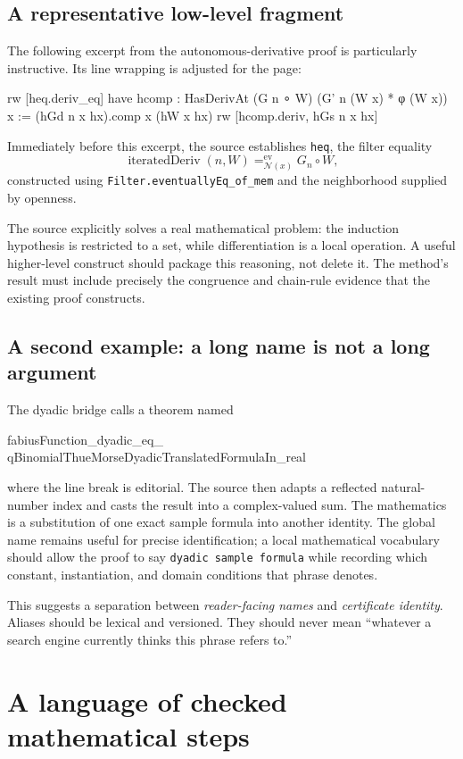 \documentclass[11pt,a4paper]{article}
\theoremstyle{remark}
\newcommand{\ty}[1]{\texttt{#1}}
\begin{document}
\subsection{A representative low-level fragment}
The following excerpt from the autonomous-derivative proof is particularly instructive. Its line wrapping is adjusted for the page:
\Needspace{82pt}
\begin{code}
rw [heq.deriv_eq]
have hcomp : HasDerivAt (G n ∘ W)
    (G' n (W x) * φ (W x)) x :=
  (hGd n x hx).comp x (hW x hx)
rw [hcomp.deriv, hGs n x hx]
\end{code}
Immediately before this excerpt, the source establishes \ty{heq}, the filter equality
\[
\operatorname{iteratedDeriv}(n,W)=^{\!\mathrm{ev}}_{\mathcal{N}(x)}G_n\circ W,
\]
constructed using \ty{Filter.eventuallyEq\_of\_mem} and the neighborhood supplied by openness.\cite{proveit-ode}

The source explicitly solves a real mathematical problem: the induction hypothesis is restricted to a set, while differentiation is a local operation. A useful higher-level construct should package this reasoning, not delete it. The method's result must include precisely the congruence and chain-rule evidence that the existing proof constructs.

\subsection{A second example: a long name is not a long argument}
The dyadic bridge calls a theorem named
\Needspace{46pt}
\begin{code}
fabiusFunction_dyadic_eq_
  qBinomialThueMorseDyadicTranslatedFormulaIn_real
\end{code}
where the line break is editorial. The source then adapts a reflected natural-number index and casts the result into a complex-valued sum.\cite{proveit-alias} The mathematics is a substitution of one exact sample formula into another identity. The global name remains useful for precise identification; a local mathematical vocabulary should allow the proof to say \ty{dyadic sample formula} while recording which constant, instantiation, and domain conditions that phrase denotes.

This suggests a separation between \emph{reader-facing names} and \emph{certificate identity}. Aliases should be lexical and versioned. They should never mean ``whatever a search engine currently thinks this phrase refers to.''

\section{A language of checked mathematical steps}\label{sec:concept}
\end{document}
